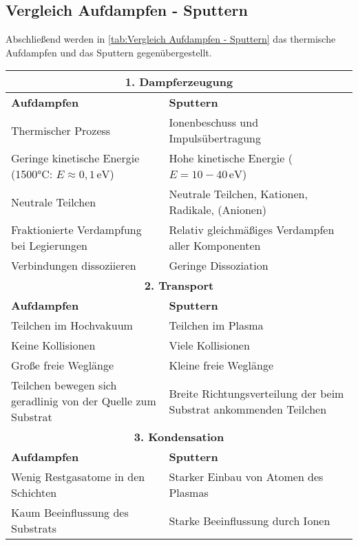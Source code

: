 \documentclass{article} %
\begin{document}
\subsection{Vergleich Aufdampfen - Sputtern}

Abschließend werden in \autoref{tab:Vergleich Aufdampfen - Sputtern} das thermische Aufdampfen und das Sputtern gegenübergestellt.

\begin{table}[htb!]
    \centering
    \renewcommand{\arraystretch}{1.5} %
    \begin{tabular}{|p{6cm}|p{6cm}|}
        \hline
        \multicolumn{2}{|c|}{\textbf{1. Dampferzeugung}} \\ \hline
        \textbf{Aufdampfen} & \textbf{Sputtern} \\ \hline
        Thermischer Prozess & Ionenbeschuss und Impulsübertragung \\
        Geringe kinetische Energie (1500°C: $E \approx 0,1 \, \mathrm{eV}$) & Hohe kinetische Energie ($E = 10 - 40 \, \mathrm{eV}$) \\
        Neutrale Teilchen & Neutrale Teilchen, Kationen, Radikale, (Anionen) \\
        Fraktionierte Verdampfung bei Legierungen & Relativ gleichmäßiges Verdampfen aller Komponenten \\
        Verbindungen dissoziieren & Geringe Dissoziation \\ \hline
        \multicolumn{2}{|c|}{\textbf{2. Transport}} \\ \hline
        \textbf{Aufdampfen} & \textbf{Sputtern} \\ \hline
        Teilchen im Hochvakuum & Teilchen im Plasma \\
        Keine Kollisionen & Viele Kollisionen \\
        Große freie Weglänge & Kleine freie Weglänge \\
        Teilchen bewegen sich geradlinig von der Quelle zum Substrat & Breite Richtungsverteilung der beim Substrat ankommenden Teilchen \\ \hline
        \multicolumn{2}{|c|}{\textbf{3. Kondensation}} \\ \hline
        \textbf{Aufdampfen} & \textbf{Sputtern} \\ \hline
        Wenig Restgasatome in den Schichten & Starker Einbau von Atomen des Plasmas \\
        Kaum Beeinflussung des Substrats & Starke Beeinflussung durch Ionen \\

\end{tabular}
\end{table}
\end{document}
